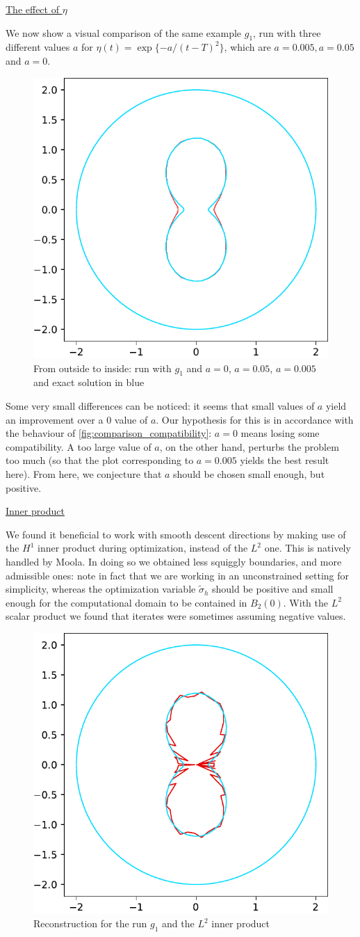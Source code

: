 \documentclass[english,a4paper,9pt,oneside]{scrbook}	%
\theoremstyle{break}
\theoremstyle{remark}
\begin{document}
\underline{The effect of $\eta$}

We now show a visual comparison of the same example $g_1$, run with three different values $a$ for $\eta(t) = \exp\{-a/(t-T)^2\}$, which are $a=0.005, a = 0.05$ and $a=0$.

\begin{figure}[H]
\centering
\includegraphics[width=0.2\columnwidth]{Images/hourglass_constant_no_eta_more_eta_cropped.pdf}
\caption{From outside to inside: run with $g_1$ and $a=0$, $a = 0.05$, $a=0.005$ and exact solution in blue}\label{fig:eta_run}
\end{figure}

Some very small differences can be noticed: it seems that small values of $a$ yield an improvement over a $0$ value of $a$. Our hypothesis for this is in accordance with the behaviour of \cref{fig:comparison_compatibility}: $a=0$ means losing some compatibility. A too large value of $a$, on the other hand, perturbs the problem too much (so that the plot corresponding to $a=0.005$ yields the best result here). From here, we conjecture that $a$ should be chosen small enough, but positive.


\underline{Inner product}

We found it beneficial to work with smooth descent directions by making use of the $H^1$ inner product during optimization, instead of the $L^2$ one. This is natively handled by Moola. In doing so we obtained less squiggly boundaries, and more admissible ones: note in fact that we are working in an unconstrained setting for simplicity, whereas the optimization variable $\tilde{\sigma}_h$ should be positive and small enough for the computational domain to be contained in $B_{2}(0)$. With the $L^2$ scalar product we found that iterates were sometimes assuming negative values.

\begin{figure}[H]
\centering
\includegraphics[height=0.3\columnwidth]{Images/hourglass_constant_l2/comparison.pdf}
\caption{Reconstruction for the run $g_1$ and the $L^2$ inner product}\label{fig:l2}
\end{figure}
\end{document}
